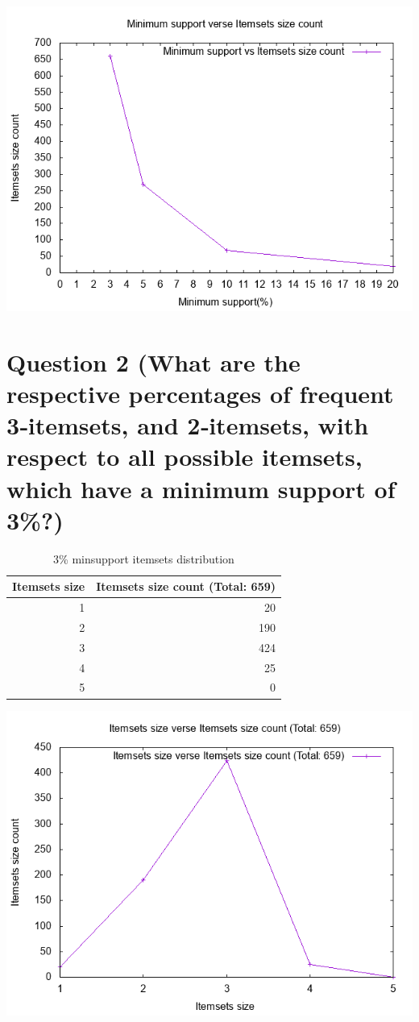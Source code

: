 \documentclass[titlepage]{article}
\begin{document}
\begin{center}
\includegraphics[width=.9\linewidth]{img/frequent.png}
\end{center}

\section{Question 2 (What are the respective percentages of frequent 3‐itemsets, and 2‐itemsets, with respect to all possible itemsets, which have a minimum support of 3\%?)}
\label{sec:org757358b}

\begin{table}[htbp]
\caption{\label{tab:org27cd88f}
3\% minsupport itemsets distribution}
\centering
\begin{tabular}{rr}
Itemsets size & Itemsets size count (Total: 659)\\
\hline
1 & 20\\
2 & 190\\
3 & 424\\
4 & 25\\
5 & 0\\
\end{tabular}
\end{table}

\begin{center}
\includegraphics[width=.9\linewidth]{img/itemsets.png}
\end{center}
\end{document}
